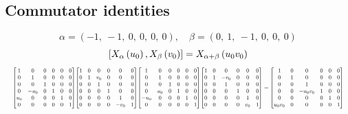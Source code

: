 \documentclass[11pt]{article}
\theoremstyle{definition}
\begin{document}
\def\arraystretch{1}

\subsection{Commutator identities}

\providecommand{\scaletoalign}[2]{%
  \sbox0{$#2$}%
  \ifdim\wd0>#1\relax 
    \resizebox{#1}{!}{\usebox0}%
  \else 
    \usebox0%
  \fi 
}
\[
\alpha = \left( -1, \  -1, \  0, \  0, \  0, \  0\right), \quad \beta = \left( 0, \  1, \  -1, \  0, \  0, \  0\right)
\]
\[
\scaletoalign{\textwidth}{\left[ X_{\alpha}\left(u_{0}\right), X_{\beta}\left(v_{0}\right) \right] = X_{\alpha + \beta}\left(u_{0} v_{0}\right)}
\]
\[
\scaletoalign{\textwidth}{{\left[\begin{matrix}1 & 0 & 0 & 0 & 0 & 0\\0 & 1 & 0 & 0 & 0 & 0\\0 & 0 & 1 & 0 & 0 & 0\\0 & - u_{0} & 0 & 1 & 0 & 0\\u_{0} & 0 & 0 & 0 & 1 & 0\\0 & 0 & 0 & 0 & 0 & 1\end{matrix}\right]} {\left[\begin{matrix}1 & 0 & 0 & 0 & 0 & 0\\0 & 1 & v_{0} & 0 & 0 & 0\\0 & 0 & 1 & 0 & 0 & 0\\0 & 0 & 0 & 1 & 0 & 0\\0 & 0 & 0 & 0 & 1 & 0\\0 & 0 & 0 & 0 & - v_{0} & 1\end{matrix}\right]} {\left[\begin{matrix}1 & 0 & 0 & 0 & 0 & 0\\0 & 1 & 0 & 0 & 0 & 0\\0 & 0 & 1 & 0 & 0 & 0\\0 & u_{0} & 0 & 1 & 0 & 0\\- u_{0} & 0 & 0 & 0 & 1 & 0\\0 & 0 & 0 & 0 & 0 & 1\end{matrix}\right]} {\left[\begin{matrix}1 & 0 & 0 & 0 & 0 & 0\\0 & 1 & - v_{0} & 0 & 0 & 0\\0 & 0 & 1 & 0 & 0 & 0\\0 & 0 & 0 & 1 & 0 & 0\\0 & 0 & 0 & 0 & 1 & 0\\0 & 0 & 0 & 0 & v_{0} & 1\end{matrix}\right]} = {\left[\begin{matrix}1 & 0 & 0 & 0 & 0 & 0\\0 & 1 & 0 & 0 & 0 & 0\\0 & 0 & 1 & 0 & 0 & 0\\0 & 0 & - u_{0} v_{0} & 1 & 0 & 0\\0 & 0 & 0 & 0 & 1 & 0\\u_{0} v_{0} & 0 & 0 & 0 & 0 & 1\end{matrix}\right]}}
\]
\end{document}

